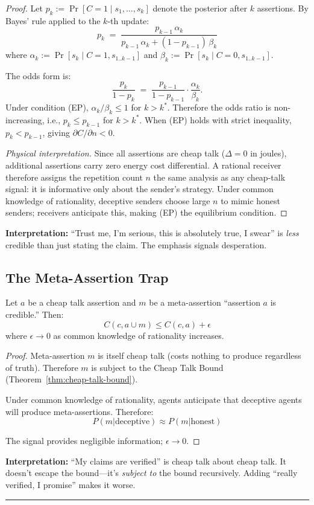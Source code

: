 \begin{proof}
Let $p_k := \Pr[C=1 \mid s_1,\ldots,s_k]$ denote the posterior after $k$ assertions.
By Bayes' rule applied to the $k$-th update:
\[
p_k \;=\; \frac{p_{k-1}\,\alpha_k}{p_{k-1}\,\alpha_k + (1-p_{k-1})\,\beta_k}
\]
where $\alpha_k := \Pr[s_k \mid C{=}1, s_{1..k-1}]$ and $\beta_k := \Pr[s_k \mid C{=}0, s_{1..k-1}]$.

The odds form is:
\[
\frac{p_k}{1-p_k} \;=\; \frac{p_{k-1}}{1-p_{k-1}} \cdot \frac{\alpha_k}{\beta_k}.
\]
Under condition (EP), $\alpha_k / \beta_k \leq 1$ for $k > k^*$.
Therefore the odds ratio is non-increasing, i.e., $p_k \leq p_{k-1}$ for $k > k^*$.
When (EP) holds with strict inequality, $p_k < p_{k-1}$, giving $\partial C / \partial n < 0$.

\textit{Physical interpretation.} Since all assertions are cheap talk ($\Delta = 0$ in joules),
additional assertions carry zero energy cost differential. A rational receiver therefore
assigns the repetition count $n$ the same analysis as any cheap-talk signal:
it is informative only about the sender's strategy. Under common knowledge of rationality,
deceptive senders choose large $n$ to mimic honest senders; receivers anticipate this, making
(EP) the equilibrium condition.
\end{proof}

\textbf{Interpretation:} ``Trust me, I'm serious, this is absolutely
true, I swear'' is \emph{less} credible than just stating the claim. The
emphasis signals desperation.

\subsection{The Meta-Assertion Trap}\label{the-meta-assertion-trap}

\begin{theorem}\label{thm:meta-assertion-trap}
Let \(a\) be a cheap talk assertion and \(m\) be a meta-assertion ``assertion \(a\) is credible.''
Then: \[C(c, a \cup m) \leq C(c, a) + \epsilon\]
where \(\epsilon \to 0\) as common knowledge of rationality increases.

  
\end{theorem}

\begin{proof}
Meta-assertion \(m\) is itself cheap talk (costs nothing to produce
regardless of truth). Therefore \(m\) is subject to the Cheap Talk Bound
(Theorem~\ref{thm:cheap-talk-bound}).

Under common knowledge of rationality, agents anticipate that deceptive
agents will produce meta-assertions. Therefore:
\[P(m | \text{deceptive}) \approx P(m | \text{honest})\]

The signal provides negligible information; \(\epsilon \to 0\).
\end{proof}

\textbf{Interpretation:} ``My claims are verified'' is cheap talk about
cheap talk. It doesn't escape the bound---it's \emph{subject to} the
bound recursively. Adding ``really verified, I promise'' makes it worse.

\begin{center}\rule{0.5\linewidth}{0.5pt}\end{center}

